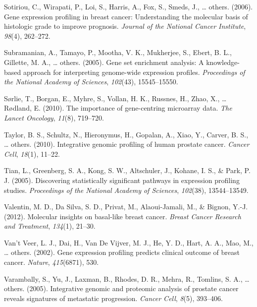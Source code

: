\documentclass[12pt,twoside]{reedthesis}
\begin{document}
\leavevmode\hypertarget{ref-sotiriou2006gene}{}%
Sotiriou, C., Wirapati, P., Loi, S., Harris, A., Fox, S., Smeds, J., \ldots{} others. (2006). Gene expression profiling in breast cancer: Understanding the molecular basis of histologic grade to improve prognosis. \emph{Journal of the National Cancer Institute}, \emph{98}(4), 262--272.

\leavevmode\hypertarget{ref-subramanian2005gene}{}%
Subramanian, A., Tamayo, P., Mootha, V. K., Mukherjee, S., Ebert, B. L., Gillette, M. A., \ldots{} others. (2005). Gene set enrichment analysis: A knowledge-based approach for interpreting genome-wide expression profiles. \emph{Proceedings of the National Academy of Sciences}, \emph{102}(43), 15545--15550.

\leavevmode\hypertarget{ref-sorlie2010importance}{}%
Sørlie, T., Borgan, E., Myhre, S., Vollan, H. K., Russnes, H., Zhao, X., \ldots{} Rødland, E. (2010). The importance of gene-centring microarray data. \emph{The Lancet Oncology}, \emph{11}(8), 719--720.

\leavevmode\hypertarget{ref-taylor2010integrative}{}%
Taylor, B. S., Schultz, N., Hieronymus, H., Gopalan, A., Xiao, Y., Carver, B. S., \ldots{} others. (2010). Integrative genomic profiling of human prostate cancer. \emph{Cancer Cell}, \emph{18}(1), 11--22.

\leavevmode\hypertarget{ref-tian2005discovering}{}%
Tian, L., Greenberg, S. A., Kong, S. W., Altschuler, J., Kohane, I. S., \& Park, P. J. (2005). Discovering statistically significant pathways in expression profiling studies. \emph{Proceedings of the National Academy of Sciences}, \emph{102}(38), 13544--13549.

\leavevmode\hypertarget{ref-valentin2012molecular}{}%
Valentin, M. D., Da Silva, S. D., Privat, M., Alaoui-Jamali, M., \& Bignon, Y.-J. (2012). Molecular insights on basal-like breast cancer. \emph{Breast Cancer Research and Treatment}, \emph{134}(1), 21--30.

\leavevmode\hypertarget{ref-van2002gene}{}%
Van't Veer, L. J., Dai, H., Van De Vijver, M. J., He, Y. D., Hart, A. A., Mao, M., \ldots{} others. (2002). Gene expression profiling predicts clinical outcome of breast cancer. \emph{Nature}, \emph{415}(6871), 530.

\leavevmode\hypertarget{ref-varambally2005integrative}{}%
Varambally, S., Yu, J., Laxman, B., Rhodes, D. R., Mehra, R., Tomlins, S. A., \ldots{} others. (2005). Integrative genomic and proteomic analysis of prostate cancer reveals signatures of metastatic progression. \emph{Cancer Cell}, \emph{8}(5), 393--406.
\end{document}
